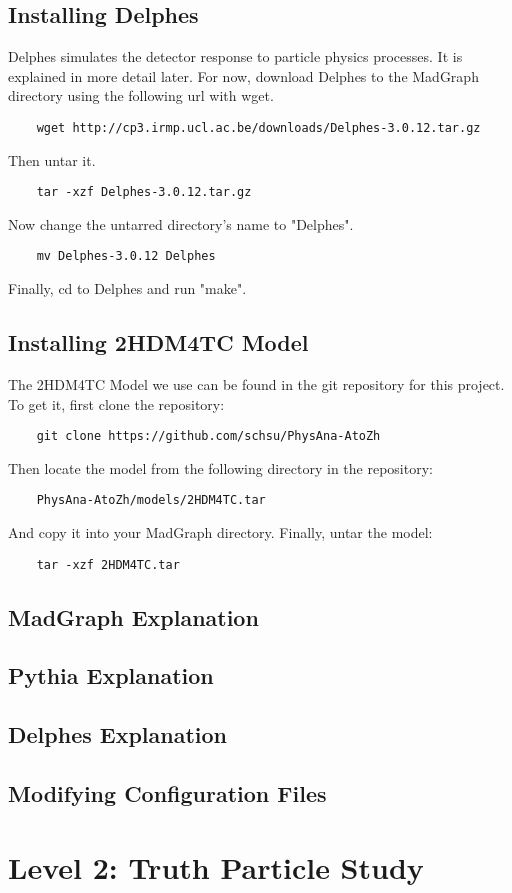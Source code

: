 \documentclass{article}
\begin{document}
\subsection {Installing Delphes}

Delphes simulates the detector response to particle physics processes. It is explained in more detail later. For now, download Delphes to the MadGraph directory using the following url with wget.

\begin{verbatim}
	wget http://cp3.irmp.ucl.ac.be/downloads/Delphes-3.0.12.tar.gz
\end{verbatim}

Then untar it.

\begin{verbatim}
	tar -xzf Delphes-3.0.12.tar.gz
\end{verbatim}

Now change the untarred directory's name to "Delphes".

\begin{verbatim}
	mv Delphes-3.0.12 Delphes
\end{verbatim}

Finally, cd to Delphes and run "make".

\subsection {Installing 2HDM4TC Model}

The 2HDM4TC Model we use can be found in the git repository for this project. To get it, first clone the repository:

\begin{verbatim}
	git clone https://github.com/schsu/PhysAna-AtoZh
\end{verbatim}

Then locate the model from the following directory in the repository:

\begin{verbatim}
	PhysAna-AtoZh/models/2HDM4TC.tar
\end{verbatim}

And copy it into your MadGraph directory. Finally, untar the model:

\begin{verbatim}
	tar -xzf 2HDM4TC.tar
\end{verbatim}

\subsection {MadGraph Explanation}

\subsection {Pythia Explanation}

\subsection {Delphes Explanation}

\subsection {Modifying Configuration Files}

\section{Level 2: Truth Particle Study}
\end{document}
